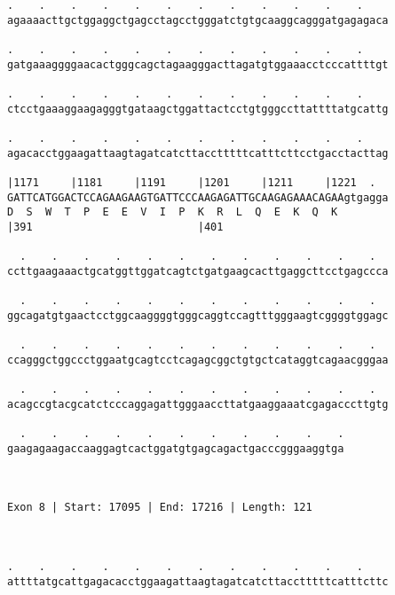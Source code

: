 \documentclass{article}
\begin{document}
\begin{Verbatim}
.    .    .    .    .    .    .    .    .    .    .    .    
agaaaacttgctggaggctgagcctagcctgggatctgtgcaaggcagggatgagagaca
                                                            
.    .    .    .    .    .    .    .    .    .    .    .    
gatgaaaggggaacactgggcagctagaagggacttagatgtggaaacctcccattttgt
                                                            
.    .    .    .    .    .    .    .    .    .    .    .    
ctcctgaaaggaagagggtgataagctggattactcctgtgggccttattttatgcattg
                                                            
.    .    .    .    .    .    .    .    .    .    .    .    
agacacctggaagattaagtagatcatcttacctttttcatttcttcctgacctacttag
                                                            
|1171     |1181     |1191     |1201     |1211     |1221  .  
GATTCATGGACTCCAGAAGAAGTGATTCCCAAGAGATTGCAAGAGAAACAGAAgtgagga
D  S  W  T  P  E  E  V  I  P  K  R  L  Q  E  K  Q  K        
|391                          |401                          
  
  .    .    .    .    .    .    .    .    .    .    .    .  
ccttgaagaaactgcatggttggatcagtctgatgaagcacttgaggcttcctgagccca
                                                            
  .    .    .    .    .    .    .    .    .    .    .    .  
ggcagatgtgaactcctggcaaggggtgggcaggtccagtttgggaagtcggggtggagc
                                                            
  .    .    .    .    .    .    .    .    .    .    .    .  
ccagggctggccctggaatgcagtcctcagagcggctgtgctcataggtcagaacgggaa
                                                            
  .    .    .    .    .    .    .    .    .    .    .    .  
acagccgtacgcatctcccaggagattgggaaccttatgaaggaaatcgagacccttgtg
                                                            
  .    .    .    .    .    .    .    .    .    .    .
gaagagaagaccaaggagtcactggatgtgagcagactgacccgggaaggtga
                                                     
                                                     
 
Exon 8 | Start: 17095 | End: 17216 | Length: 121



.    .    .    .    .    .    .    .    .    .    .    .    
attttatgcattgagacacctggaagattaagtagatcatcttacctttttcatttcttc
                                                            

\end{Verbatim}
\end{document}
